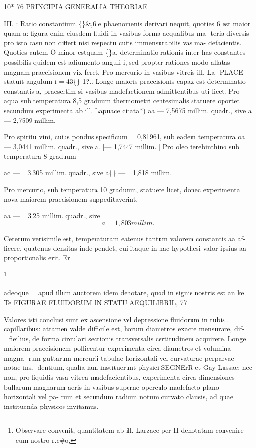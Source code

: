 \documentclass[12pt,a4paper]{article}
\begin{document}
10*
76                                     PRINCIPIA   GENERALIA       THEORIAE


III. : Ratio constantium               \guillemotleft\{\}\&,6 e phaenomenis derivari nequit, quoties 6
est maior quam a: figura enim eiusdem fluidi in vasibus forma aequalibus ma-
teria diversis pro isto casu non differt nisi respectu cutis immensurabilis vas ma-
defacientis.   Quoties autem Ö minor estquam \guillemotleft\{\}a, determinatio rationis inter has
constantes possibilis quidem est adiumento anguli i, sed propter rationes modo
allatas magnam praecisionem vix feret. Pro mercurio in vasibus vitreis ill. La-
PLACE statuit angulum i = 43\textdegree\{\} 1?..
Longe maioris praecisionis capax est determinatio constantis                           a, praesertim
si vasibus madefactionem admittentibus uti licet. Pro aqua sub temperatura
8,5 graduum thermometri centesimalis statuere oportet secundum experimenta
ab ill. Lapuace citata*)
aa   --- 7,5675 millim. quadr., sive
a ---     2,7509 millim.

Pro spiritu vini, cuius pondus specificum = 0,81961,                           sub eadem temperatura
oa --- 3,0441 millim. quadr., sive
a. |--- 1,7447 millim.                        |
Pro oleo terebinthino sub temperatura                    8 graduum

ac ---= 3,305 millim. quadr., sive
a\guillemotleft\{\} ---= 1,818 millim.

Pro mercurio, sub temperatura 10 graduum,                            statuere licet, donec experimenta
nova maiorem praecisionem suppeditaverint,

aa ---= 3,25 millim. quadr., sive
\[                                    a = 1,803 millim.\]

Ceterum verisimile est, temperaturam eatenus tantum valorem constantis aa af-
ficere, quatenus densitas inde pendet, cui itaque in hac hypothesi valor ipsius
aa proportionalis erit.
Er


\footnote{Observare   convenit,    quantitatem   ab ill. Larzace   per H denotatam   convenire cum nostro   r.c\#o,}

adeoque   =   apud illum auctorem     idem denotare,   quod in signis nostris est an ke      Te
FIGURAE   FLUIDORUM   IN STATU   AEQUILIBRIL,                   77


Valores isti conclusi sunt ex ascensione vel depressione fluidorum in tubis
. capillaribus: attamen valde difficile est, horum diametros exacte mensurare, dif-
\_fieilius, de forma circulari sectionis transversalis certitudinem acquirere. Longe
maiorem praecisionem pollicentur experimenta circa diametros et volumina magna-
rum guttarum mercurii tabulae horizontali vel curvaturae perparvae notae insi-
dentium, qualia iam instituerunt physici SEGNErR et Gay-Lussac: nec non, pro
liquidis vasa   vitrea   madefacientibus,      experimenta     circa dimensiones   bullarum
magnarum aeris in vasibus superne operculo madefacto plano horizontali vel pa-
rum et secundum radium notum curvato clausis, ad quae instituenda physicos
invitamus.
\end{document}
